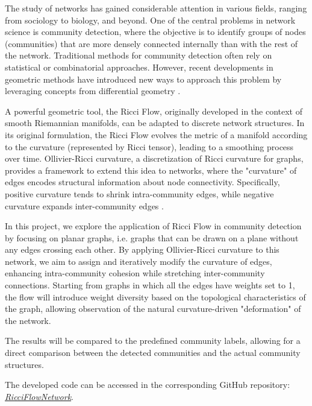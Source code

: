 The study of networks has gained considerable attention in various fields, ranging from sociology to biology, and beyond. One of the central problems in network science is community detection, where the objective is to identify groups of nodes (communities) that are more densely connected internally than with the rest of the network. Traditional methods for community detection often rely on statistical or combinatorial approaches. However, recent developments in geometric methods have introduced new ways to approach this problem by leveraging concepts from differential geometry \cite{communitydetectionnetworksricci}.

A powerful geometric tool, the Ricci Flow, originally developed in the context of smooth Riemannian manifolds, can be adapted to discrete network structures. In its original formulation, the Ricci Flow evolves the metric of a manifold according to the curvature (represented by Ricci tensor), leading to a smoothing process over time. Ollivier-Ricci curvature, a discretization of Ricci curvature for graphs, provides a framework to extend this idea to networks, where the "curvature" of edges encodes structural information about node connectivity. Specifically, positive curvature tends to shrink intra-community edges, while negative curvature expands inter-community edges \cite{communitydetectionnetworksricci}.

In this project, we explore the application of Ricci Flow in community detection by focusing on planar graphs, i.e. graphs that can be drawn on a plane without any edges crossing each other. By applying Ollivier-Ricci curvature to this network, we aim to assign and iteratively modify the curvature of edges, enhancing intra-community cohesion while stretching inter-community connections. Starting from graphs in which all the edges have weights set to 1, the flow will introduce weight diversity based on the topological characteristics of the graph, allowing observation of the natural curvature-driven "deformation" of the network.

The results will be compared to the predefined community labels, allowing for a direct comparison between the detected communities and the actual community structures. 

The developed code can be accessed in the corresponding GitHub repository: \textit{\href{https://github.com/fabbri-lorenzo/RicciFlowNetwork}{RicciFlowNetwork}}.